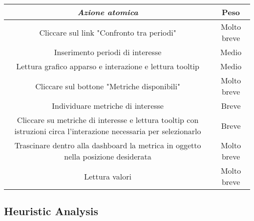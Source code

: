 {
\renewcommand{\arraystretch}{2}
\begin{longtable}[h]{| c | c |}
    \hline
    \textit{Azione atomica} & \textbf{Peso} \\
    \hline
    \endhead
    Cliccare sul link "Confronto tra periodi" & Molto breve \\
    \hline
    Inserimento periodi di interesse & Medio  \\
    \hline
    Lettura grafico apparso e interazione e lettura tooltip & Medio \\
    \hline
    Cliccare sul bottone "Metriche disponibili" & Molto breve \\
    \hline
    Individuare metriche di interesse & Breve \\
    \hline
    Cliccare su metriche di interesse e lettura tooltip con istruzioni circa l'interazione necessaria per selezionarlo & Breve \\
    \hline
    Trascinare dentro alla dashboard la metrica in oggetto nella posizione desiderata & Molto breve \\
    \hline
    Lettura valori & Molto breve \\
    \hline
\end{longtable}
}

\subsection{Heuristic Analysis}
\label{ss:heuristic-analysis}

